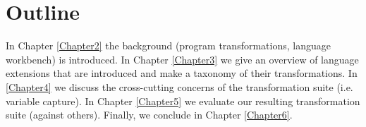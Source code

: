 \section{Outline}
In Chapter \ref{Chapter2} the background (program transformations, language workbench) is introduced. In Chapter \ref{Chapter3} we give an overview of language extensions that are introduced and make a taxonomy of their transformations. In \ref{Chapter4} we discuss the cross-cutting concerns of the transformation suite (i.e. variable capture). In Chapter \ref{Chapter5} we evaluate our resulting transformation suite (against others). Finally, we conclude in Chapter \ref{Chapter6}.